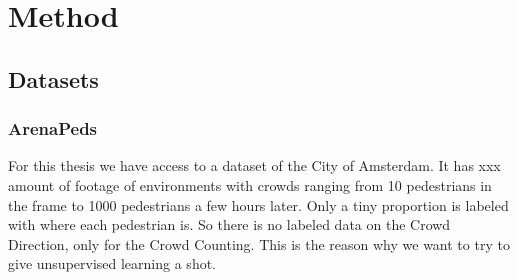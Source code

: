 \section{Method}

\subsection{Datasets}

\subsubsection{ArenaPeds}
For this thesis we have access to a dataset of the City of Amsterdam. It has xxx amount of footage of environments with crowds ranging from 10 pedestrians in the frame to 1000 pedestrians a few hours later. Only a tiny proportion is labeled with where each pedestrian is. So there is no labeled data on the Crowd Direction, only for the Crowd Counting. This is the reason why we want to try to give unsupervised learning a shot.
